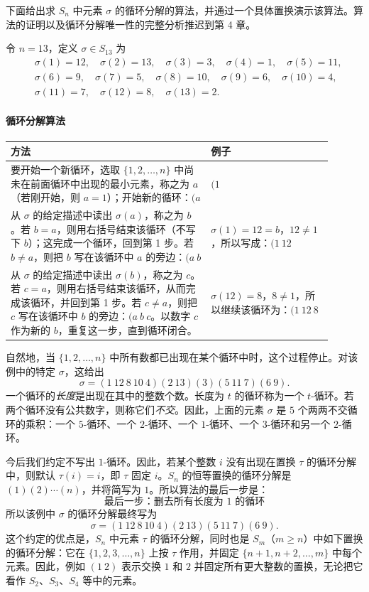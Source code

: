 下面给出求 $S_n$ 中元素 $\sigma$ 的循环分解的算法，并通过一个具体置换演示该算法。算法的证明以及循环分解唯一性的完整分析推迟到第 4 章。

令 $n=13$，定义 $\sigma\in S_{13}$ 为
\begin{align*}
&\sigma(1)=12,\quad \sigma(2)=13,\quad \sigma(3)=3,\quad \sigma(4)=1,\quad \sigma(5)=11,\\
&\sigma(6)=9,\quad \sigma(7)=5,\quad \sigma(8)=10,\quad \sigma(9)=6,\quad \sigma(10)=4,\\
&\sigma(11)=7,\quad \sigma(12)=8,\quad \sigma(13)=2.
\end{align*}

\paragraph{循环分解算法}
\begin{center}
\begin{tabular}{p{0.56\linewidth}|p{0.34\linewidth}}
\textbf{方法} & \textbf{例子} \\ \hline
要开始一个新循环，选取 $\{1,2,\ldots,n\}$ 中尚未在前面循环中出现的最小元素，称之为 $a$（若刚开始，则 $a=1$）；开始新的循环：$(a$
& $(1$ \\[0.8em]
从 $\sigma$ 的给定描述中读出 $\sigma(a)$，称之为 $b$。若 $b=a$，则用右括号结束该循环（不写下 $b$）；这完成一个循环，回到第 1 步。若 $b\neq a$，则把 $b$ 写在该循环中 $a$ 的旁边：$(a\ b$
& $\sigma(1)=12=b$，$12\neq1$，所以写成：$(1\ 12$ \\[0.8em]
从 $\sigma$ 的给定描述中读出 $\sigma(b)$，称之为 $c$。若 $c=a$，则用右括号结束该循环，从而完成该循环，并回到第 1 步。若 $c\neq a$，则把 $c$ 写在该循环中 $b$ 的旁边：$(a\ b\ c$。以数字 $c$ 作为新的 $b$，重复这一步，直到循环闭合。
& $\sigma(12)=8$，$8\neq1$，所以继续该循环为：$(1\ 12\ 8$ 
\end{tabular}
\end{center}
自然地，当 $\{1,2,\ldots,n\}$ 中所有数都已出现在某个循环中时，这个过程停止。对该例中的特定 $\sigma$，这给出
\[
  \sigma=(1\ 12\ 8\ 10\ 4)(2\ 13)(3)(5\ 11\ 7)(6\ 9).
\]
一个循环的\emph{长度}是出现在其中的整数个数。长度为 $t$ 的循环称为一个 $t$-循环。若两个循环没有公共数字，则称它们\emph{不交}。因此，上面的元素 $\sigma$ 是 $5$ 个两两不交循环的乘积：一个 $5$-循环、一个 $2$-循环、一个 $1$-循环、一个 $3$-循环和另一个 $2$-循环。

今后我们约定不写出 $1$-循环。因此，若某个整数 $i$ 没有出现在置换 $\tau$ 的循环分解中，则默认 $\tau(i)=i$，即 $\tau$ 固定 $i$。$S_n$ 的恒等置换的循环分解是 $(1)(2)\cdots(n)$，并将简写为 $1$。所以算法的最后一步是：
\[
\boxed{\text{最后一步：删去所有长度为 }1\text{ 的循环}}
\]
所以该例中 $\sigma$ 的循环分解最终写为
\[
  \sigma=(1\ 12\ 8\ 10\ 4)(2\ 13)(5\ 11\ 7)(6\ 9).
\]
这个约定的优点是，$S_n$ 中元素 $\tau$ 的循环分解，同时也是 $S_m$（$m\geq n$）中如下置换的循环分解：它在 $\{1,2,3,\ldots,n\}$ 上按 $\tau$ 作用，并固定 $\{n+1,n+2,\ldots,m\}$ 中每个元素。因此，例如 $(1\ 2)$ 表示交换 $1$ 和 $2$ 并固定所有更大整数的置换，无论把它看作 $S_2$、$S_3$、$S_4$ 等中的元素。

